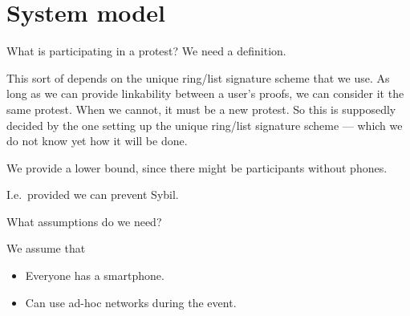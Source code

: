 \mode*

\section{System model}
\label{SystemModel}

\begin{frame}
\begin{question}
  What is participating in a protest?
  We need a definition.
\end{question}
\end{frame}
This sort of depends on the unique ring/list signature scheme that we use.
As long as we can provide linkability between a user's proofs, we can consider 
it the same protest.
When we cannot, it must be a new protest.
So this is supposedly decided by the one setting up the unique ring/list 
signature scheme --- which we do not know yet how it will be done.

\begin{frame}
\begin{remark}
  We provide a lower bound, since there might be participants without phones.
\end{remark}
\begin{remark}
  I.e.\ provided we can prevent Sybil.
\end{remark}
\end{frame}

\begin{frame}
\begin{question}
  What assumptions do we need?
\end{question}

We assume that
\begin{itemize}
  \item Everyone has a smartphone.
  \item Can use ad-hoc networks during the event.
\end{itemize}
\end{frame}

